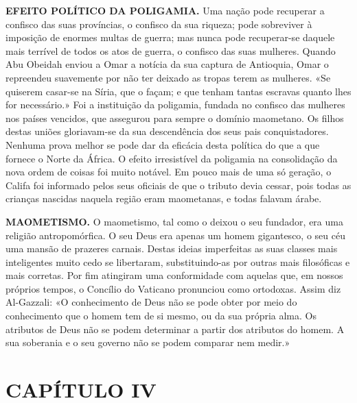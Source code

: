 \documentclass[11pt,a5paper,twoside,openany]{book}
\begin{document}
\textbf{EFEITO POLÍTICO DA POLIGAMIA.} Uma nação pode recuperar a confisco das suas províncias, o confisco da sua riqueza; pode sobreviver à imposição de enormes multas de guerra; mas nunca pode recuperar-se daquele mais terrível de todos os atos de guerra, o confisco das suas mulheres. Quando Abu Obeidah enviou a Omar a notícia da sua captura de Antioquia, Omar o repreendeu suavemente por não ter deixado as tropas terem as mulheres. «Se quiserem casar-se na Síria, que o façam; e que tenham tantas escravas quanto lhes for necessário.» Foi a instituição da poligamia, fundada no confisco das mulheres nos países vencidos, que assegurou para sempre o domínio maometano. Os filhos destas uniões gloriavam-se da sua descendência dos seus pais conquistadores. Nenhuma prova melhor se pode dar da eficácia desta política do que a que fornece o Norte da África. O efeito irresistível da poligamia na consolidação da nova ordem de coisas foi muito notável. Em pouco mais de uma só geração, o Califa foi informado pelos seus oficiais de que o tributo devia cessar, pois todas as crianças nascidas naquela região eram maometanas, e todas falavam árabe.

\textbf{MAOMETISMO.} O maometismo, tal como o deixou o seu fundador, era uma religião antropomórfica. O seu Deus era apenas um homem gigantesco, o seu céu uma mansão de prazeres carnais. Destas ideias imperfeitas as suas classes mais inteligentes muito cedo se libertaram, substituindo-as por outras mais filosóficas e mais corretas. Por fim atingiram uma conformidade com aquelas que, em nossos próprios tempos, o Concílio do Vaticano pronunciou como ortodoxas. Assim diz Al-Gazzali: «O conhecimento de Deus não se pode obter por meio do conhecimento que o homem tem de si mesmo, ou da sua própria alma. Os atributos de Deus não se podem determinar a partir dos atributos do homem. A sua soberania e o seu governo não se podem comparar nem medir.»

\clearpage
\chapter*{CAPÍTULO IV}
\end{document}
